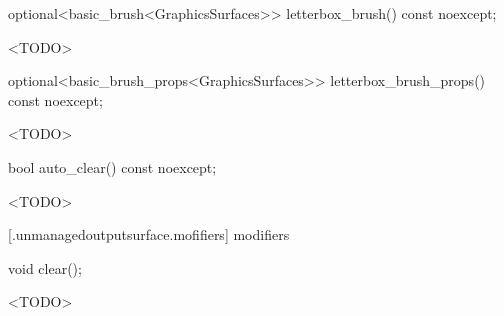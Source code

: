 %
\begin{itemdecl}
optional<basic_brush<GraphicsSurfaces>> letterbox_brush() const noexcept;
\end{itemdecl}
\begin{itemdescr}
\pnum
\returns
<TODO>
\end{itemdescr}

%
\begin{itemdecl}
optional<basic_brush_props<GraphicsSurfaces>> letterbox_brush_props() const noexcept;
\end{itemdecl}
\begin{itemdescr}
\pnum
\returns
<TODO>
\end{itemdescr}

%
\begin{itemdecl}
bool auto_clear() const noexcept;
\end{itemdecl}
\begin{itemdescr}
\pnum
\returns
<TODO>
\end{itemdescr}

 [\iotwod.unmanagedoutputsurface.mofifiers] { modifiers}

%
\begin{itemdecl}
void clear();
\end{itemdecl}
\begin{itemdescr}
\pnum
\effects
<TODO>
\end{itemdescr}

